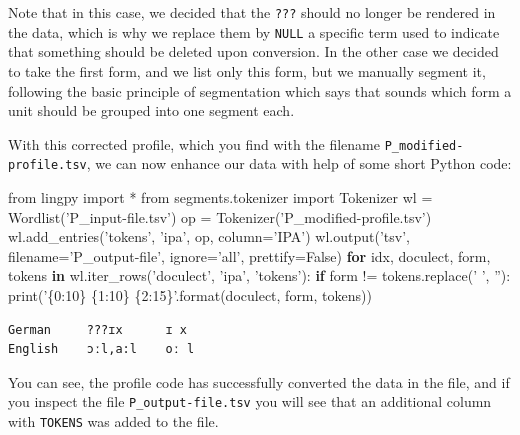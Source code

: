 \documentclass[a4paper,svgnames]{scrartcl}
\newenvironment{Shaded}{}{}
\newcommand{\KeywordTok}[1]{\textcolor[rgb]{0.00,0.44,0.13}{\textbf{#1}}}
\newcommand{\SpecialCharTok}[1]{\textcolor[rgb]{0.25,0.44,0.63}{#1}}
\newcommand{\StringTok}[1]{\textcolor[rgb]{0.25,0.44,0.63}{#1}}
\newcommand{\ImportTok}[1]{#1}
\newcommand{\VariableTok}[1]{\textcolor[rgb]{0.10,0.09,0.49}{#1}}
\newcommand{\ControlFlowTok}[1]{\textcolor[rgb]{0.00,0.44,0.13}{\textbf{#1}}}
\newcommand{\OperatorTok}[1]{\textcolor[rgb]{0.40,0.40,0.40}{#1}}
\newcommand{\BuiltInTok}[1]{#1}
\newcommand{\NormalTok}[1]{#1}
\begin{document}
Note that in this case, we decided that the \texttt{???} should no
longer be rendered in the data, which is why we replace them by
\texttt{NULL} a specific term used to indicate that something should be
deleted upon conversion. In the other case we decided to take the first
form, and we list only this form, but we manually segment it, following
the basic principle of segmentation which says that sounds which form a
unit should be grouped into one segment each.

With this corrected profile, which you find with the filename
\texttt{P\_modified-profile.tsv}, we can now enhance our data with help
of some short Python code:

\begin{Shaded}
\begin{Highlighting}[]
\ImportTok{from}\NormalTok{ lingpy }\ImportTok{import} \OperatorTok{*}
\ImportTok{from}\NormalTok{ segments.tokenizer }\ImportTok{import}\NormalTok{ Tokenizer}
\NormalTok{wl }\OperatorTok{=}\NormalTok{ Wordlist(}\StringTok{'P_input-file.tsv'}\NormalTok{)}
\NormalTok{op }\OperatorTok{=}\NormalTok{ Tokenizer(}\StringTok{'P_modified-profile.tsv'}\NormalTok{)}
\NormalTok{wl.add_entries(}\StringTok{'tokens'}\NormalTok{, }\StringTok{'ipa'}\NormalTok{, op, column}\OperatorTok{=}\StringTok{'IPA'}\NormalTok{)}
\NormalTok{wl.output(}\StringTok{'tsv'}\NormalTok{, filename}\OperatorTok{=}\StringTok{'P_output-file'}\NormalTok{, ignore}\OperatorTok{=}\StringTok{'all'}\NormalTok{,}
    \NormalTok{prettify}\OperatorTok{=}\VariableTok{False}\NormalTok{)}
\ControlFlowTok{for}\NormalTok{ idx, doculect, form, tokens }\KeywordTok{in}\NormalTok{ wl.iter_rows(}\StringTok{'doculect'}\NormalTok{, }\StringTok{'ipa'}\NormalTok{, }\StringTok{'tokens'}\NormalTok{):}
    \ControlFlowTok{if}\NormalTok{ form }\OperatorTok{!=}\NormalTok{ tokens.replace(}\StringTok{' '}\NormalTok{, }\StringTok{''}\NormalTok{):}
        \BuiltInTok{print}\NormalTok{(}\StringTok{'}\SpecialCharTok{\{0:10\}}\StringTok{ }\SpecialCharTok{\{1:10\}}\StringTok{ }\SpecialCharTok{\{2:15\}}\StringTok{'}\NormalTok{.}\BuiltInTok{format}\NormalTok{(doculect, form, tokens))}
    \end{Highlighting}
\end{Shaded}

\begin{verbatim}
German     ???ɪx      ɪ x            
English    ɔːl,a:l    oː l           
\end{verbatim}

You can see, the profile code has successfully converted the data in the
file, and if you inspect the file \texttt{P\_output-file.tsv} you will
see that an additional column with \texttt{TOKENS} was added to the
file.
\end{document}
